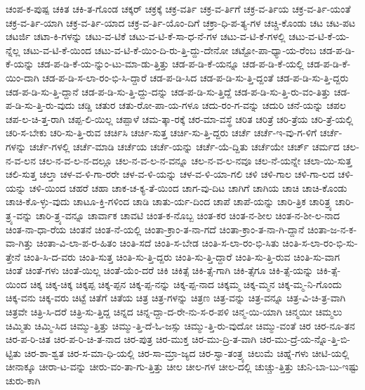 {ಚಂಪ-ಕ-ಪುಷ್ಪ
ಚಕಿತ
ಚಕಿ-ತ-ಗೊಂಡ
ಚಕ್ಕರ್
ಚಕ್ರಕ್ಕೆ
ಚಕ್ರ-ವರ್ತಿ
ಚಕ್ರ-ವ-ರ್ತಿಗೆ
ಚಕ್ರ-ವ-ರ್ತಿಯ
ಚಕ್ರ-ವ-ರ್ತಿ-ಯಂತೆ
ಚಕ್ರ-ವ-ರ್ತಿ-ಯಾಗಿ
ಚಕ್ರ-ವ-ರ್ತಿ-ಯಾದ
ಚಕ್ರ-ವ-ರ್ತಿ-ಯೊಂ-ದಿಗೆ
ಚಕ್ರಾ-ಧಿ-ಪ-ತ್ಯ-ಗಳ
ಚಚ್ಚಿ-ಕೊಂಡು
ಚಟ
ಚಟ-ಪಟ
ಚಟರ್ಜಿ
ಚಟಾ-ಕಿ-ಗಳನ್ನು
ಚಟು-ವ-ಟಿಕೆ
ಚಟು-ವ-ಟಿ-ಕೆ-ಸಾ-ಧ-ನೆ-ಗಳ
ಚಟು-ವ-ಟಿ-ಕೆ-ಗಳಲ್ಲಿ
ಚಟು-ವ-ಟಿ-ಕೆ-ಯ-ನ್ನೆಲ್ಲ
ಚಟು-ವ-ಟಿ-ಕೆ-ಯಿಂದ
ಚಟು-ವ-ಟಿ-ಕೆ-ಯಿಂ-ದಿ-ರು-ತ್ತಿ-ದ್ದು-ದೇನೋ
ಚಟ್ಟೋ-ಪಾ-ಧ್ಯಾ-ಯ-ರೆಂಬ
ಚಡ-ಪ-ಡಿ-ಕೆ-ಯನ್ನು
ಚಡ-ಪ-ಡಿ-ಕೆ-ಯ-ನ್ನುಂ-ಟು-ಮಾ-ಡು-ತ್ತಿತ್ತು
ಚಡ-ಪ-ಡಿ-ಕೆ-ಯನ್ನೂ
ಚಡ-ಪ-ಡಿ-ಕೆ-ಯಲ್ಲಿ
ಚಡ-ಪ-ಡಿ-ಕೆ-ಯಿಂ-ದಾಗಿ
ಚಡ-ಪ-ಡಿ-ಸ-ಲಾ-ರಂ-ಭಿ-ಸಿ-ದ್ದಾರೆ
ಚಡ-ಪ-ಡಿ-ಸಿದ
ಚಡ-ಪ-ಡಿ-ಸು-ತ್ತಿ-ದ್ದಂತೆ
ಚಡ-ಪ-ಡಿ-ಸು-ತ್ತಿ-ದ್ದರು
ಚಡ-ಪ-ಡಿ-ಸು-ತ್ತಿ-ದ್ದಾನೆ
ಚಡ-ಪ-ಡಿ-ಸು-ತ್ತಿ-ದ್ದು-ದನ್ನು
ಚಡ-ಪ-ಡಿ-ಸು-ತ್ತಿದ್ದೆ
ಚಡ-ಪ-ಡಿ-ಸು-ತ್ತಿ-ರು-ವಂ-ತಿತ್ತು
ಚಡ-ಪ-ಡಿ-ಸು-ತ್ತಿ-ರು-ವುದು
ಚಡ್ಡಿ
ಚತುರ
ಚತು-ರೋ-ಪಾ-ಯ-ಗಳೂ
ಚದು-ರಂ-ಗ-ವನ್ನು
ಚದುರಿ
ಚನೆ-ಯನ್ನು
ಚಪಲ
ಚಪ-ಲ-ಚಿ-ತ್ತ-ರಾಗಿ
ಚಪ್ಪ-ಲಿ-ಯಿಲ್ಲ
ಚಪ್ಪಾಳೆ
ಚಮ-ತ್ಕಾ-ರಕ್ಕೆ
ಚರ-ಮಾ-ವಸ್ಥೆ
ಚರಿತ
ಚರಿತ್ರೆ
ಚರಿ-ತ್ರೆಯ
ಚರಿ-ತ್ರೆ-ಯಲ್ಲಿ
ಚರಿ-ಸ-ಬೇಕು
ಚರಿ-ಸು-ತ್ತಿ-ರುವ
ಚರ್ಚಿಸಿ
ಚರ್ಚಿ-ಸುತ್ತ
ಚರ್ಚಿ-ಸು-ತ್ತಿ-ದ್ದರು
ಚರ್ಚೆ
ಚರ್ಚೆ-ಇ-ವು-ಗ-ಳಿಗೆ
ಚರ್ಚೆ-ಗಳನ್ನು
ಚರ್ಚೆ-ಗಳಲ್ಲಿ
ಚರ್ಚೆ-ಮಾಡಿ
ಚರ್ಚೆಯ
ಚರ್ಚೆ-ಯನ್ನು
ಚರ್ಚೆ-ಯೆ-ದ್ದಿತು
ಚರ್ಚೆಯೇ
ಚರ್ಚ್
ಚರ್ಮದ
ಚಲ-ನ-ವ-ಲನ
ಚಲ-ನ-ವ-ಲ-ನ-ದಲ್ಲೂ
ಚಲ-ನ-ವ-ಲ-ನ-ವನ್ನೂ
ಚಲ-ನ-ವ-ಲ-ನವೂ
ಚಲ-ನೆ-ಯನ್ನೇ
ಚಲಾ-ಯಿ-ಸುತ್ತ
ಚಲಿ-ಸುತ್ತ
ಚಲ್ತಾ
ಚಳ-ವ-ಳಿ-ಗಾ-ರರೇ
ಚಳ-ವ-ಳಿ-ಯನ್ನು
ಚಳ-ವ-ಳಿ-ಯಾ-ಗಲಿ
ಚಳಿ
ಚಳಿ-ಗಾಲ
ಚಳಿ-ಗಾ-ಲದ
ಚಳಿ-ಯನ್ನು
ಚಳಿ-ಯಿಂದ
ಚಹರೆ
ಚಹಾ
ಚಾಕ-ಚ-ಕ್ಯ-ತೆ-ಯಿಂದ
ಚಾಗ-ವು-ದಿಟ
ಚಾಗಿಗೆ
ಚಾಗಿಯ
ಚಾಚಿ
ಚಾಚಿ-ಕೊಂಡು
ಚಾಚಿ-ಕೊ-ಳ್ಳು-ವುದು
ಚಾಟೂ-ಕ್ತಿ-ಗಳಿಂದ
ಚಾಡಿ
ಚಾತು-ರ್ಯ-ದಿಂದ
ಚಾಪೆ
ಚಾಪೆ-ಯನ್ನು
ಚಾರಿ-ತ್ರಿಕ
ಚಾರಿತ್ರ್ಯ
ಚಾರಿ-ತ್ರ್ಯ-ವನ್ನು
ಚಾರಿ-ತ್ರ್ಯ-ವನ್ನೂ
ಚಾರ್ವಾಕ
ಚಾವಟಿ
ಚಿಂತ-ಕ-ನೊಬ್ಬ
ಚಿಂತ-ಕರ
ಚಿಂತ-ನ-ಶೀಲ
ಚಿಂತ-ನ-ಶೀ-ಲ-ನಾದ
ಚಿಂತ-ನಾ-ಧಾ-ರೆಯ
ಚಿಂತನೆ
ಚಿಂತ-ನೆ-ಯಲ್ಲಿ
ಚಿಂತಾ-ಕ್ರಾಂ-ತ-ನಾ-ಗದೆ
ಚಿಂತಾ-ಕ್ರಾಂ-ತ-ನಾ-ಗಿ-ದ್ದಾನೆ
ಚಿಂತಾ-ಜ-ನ-ಕ-ವಾ-ಗಿತ್ತು
ಚಿಂತಾ-ವಿ-ಲಾ-ಪ-ರ-ಹಿತಂ
ಚಿಂತಿ-ಸದೆ
ಚಿಂತಿ-ಸ-ಬೇಡ
ಚಿಂತಿ-ಸ-ಲಾ-ರಂ-ಭಿ-ಸಿತು
ಚಿಂತಿ-ಸ-ಲಾ-ರಂ-ಭಿ-ಸು-ತ್ತೇನೆ
ಚಿಂತಿ-ಸಿ-ದ-ವರು
ಚಿಂತಿ-ಸುತ್ತ
ಚಿಂತಿ-ಸು-ತ್ತಿ-ದ್ದರು
ಚಿಂತಿ-ಸು-ತ್ತಿ-ದ್ದಾರೆ
ಚಿಂತಿ-ಸು-ತ್ತಿ-ರುವ
ಚಿಂತಿ-ಸು-ವಾಗ
ಚಿಂತೆ
ಚಿಂತೆ-ಗಳು
ಚಿಂತೆ-ಯಿಲ್ಲ
ಚಿಂತೆ-ಯೆಂ-ದರೆ
ಚಿಕಿ
ಚಿಕಿತ್ಸೆ
ಚಿಕಿ-ತ್ಸೆ-ಗಾಗಿ
ಚಿಕಿ-ತ್ಸೆಗೂ
ಚಿಕಿ-ತ್ಸೆ-ಯನ್ನು
ಚಿಕಿ-ತ್ಸೆ-ಯಿಂದ
ಚಿಕ್ಕ
ಚಿಕ್ಕ-ಚಿಕ್ಕ
ಚಿಕ್ಕಪ್ಪ
ಚಿಕ್ಕ-ಪ್ಪನ
ಚಿಕ್ಕ-ಪ್ಪ-ನನ್ನು
ಚಿಕ್ಕ-ಪ್ಪ-ನಾದ
ಚಿಕ್ಕಮ್ಮ
ಚಿಕ್ಕ-ಮ್ಮನ
ಚಿಕ್ಕ-ಮ್ಮ-ನಿ-ಗೊಂದು
ಚಿಕ್ಕ-ವನು
ಚಿಕ್ಕ-ವರು
ಚಿಟ್ಟೆ
ಚಿತೆಗೆ
ಚಿತೆಯ
ಚಿತ್ರ
ಚಿತ್ರ-ಗಳನ್ನು
ಚಿತ್ರಣ
ಚಿತ್ರ-ವನ್ನು
ಚಿತ್ರ-ವನ್ನೂ
ಚಿತ್ರ-ವಿ-ಚಿ-ತ್ರ-ವಾಗಿ
ಚಿತ್ರವೇ
ಚಿತ್ರಿ-ಸಿ-ದರೆ
ಚಿತ್ರಿ-ಸು-ತ್ತಿದ್ದ
ಚಿನ್ನದ
ಚಿನ್ನ-ದ್ದಾ-ದ-ರೇ-ನು-ಸ-ರ-ಪಳಿ
ಚಿನ್ಮ-ಯಿ-ಯಾಗಿ
ಚಿನ್ಮಯೀ
ಚಿಮ್ಮಲು
ಚಿಮ್ಮಿತು
ಚಿಮ್ಮಿ-ಸಿದ
ಚಿಮ್ಮು-ತ್ತಿತ್ತು
ಚಿಮ್ಮು-ತ್ತಿ-ದೆ-ಓ-ಜಸ್ಸು
ಚಿಮ್ಮು-ತ್ತಿ-ರು-ವುದೋ
ಚಿಮ್ಮು-ವಂತೆ
ಚಿರ
ಚಿರ-ನೂ-ತನ
ಚಿರ-ಪ-ರಿ-ಚಿತ
ಚಿರ-ಪ-ರಿ-ಚಿ-ತ-ನಾದ
ಚಿರ-ಪುತ್ರ
ಚಿರ-ಮುಕ್ತ
ಚಿರ-ಮು-ದ್ರಿ-ತ-ವಾಗಿ
ಚಿರ-ಮು-ದ್ರೆ-ಯ-ನ್ನೊ-ತ್ತಿ-ಬಿ-ಟ್ಟಿತು
ಚಿರ-ಶಾ-ಶ್ವತ
ಚಿರ-ಸ-ಮಾ-ಧಿ-ಯಲ್ಲಿ
ಚಿರ-ಸಾ-ಮ್ರಾ-ಜ್ಯದ
ಚಿರ-ಸ್ವಾ-ತಂತ್ರ್ಯ
ಚಿಲುಮೆ
ಚಿಹ್ನೆ-ಗಳು
ಚೀಟಿ-ಯಲ್ಲಿ
ಚೀನಾಕ್ಕೂ
ಚೀರಾ-ಟ-ವನ್ನು
ಚೀರು-ವಂ-ತಾ-ಗು-ತ್ತಿತ್ತು
ಚೀಲ
ಚೀಲ-ಗಳ
ಚೀಲ-ದಲ್ಲಿ
ಚುಚ್ಚು-ತ್ತಿತ್ತು
ಚುನಿ-ಬಾ-ಬು-ಇಷ್ಟು
ಚುರು-ಕಾಗಿ
}
